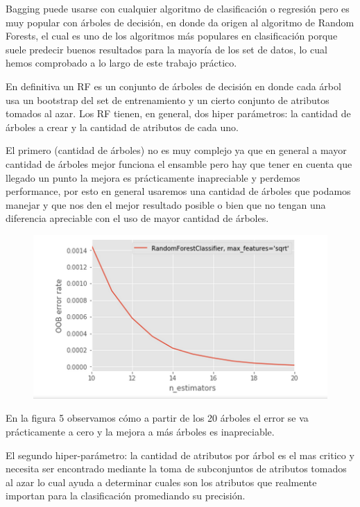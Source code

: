 \documentclass[a4paper,10pt]{article}
\begin{document}
Bagging puede usarse con cualquier algoritmo de clasificación o regresión pero es muy popular con árboles de decisión, en donde da origen al algoritmo de Random Forests, el cual es uno de los algoritmos más populares en clasificación porque suele predecir buenos resultados para la mayoría de los set de datos, lo cual hemos comprobado a lo largo de este trabajo práctico.

\medskip

En definitiva un RF es un conjunto de árboles de decisión en donde cada árbol usa un bootstrap del set de entrenamiento y un cierto conjunto de atributos tomados al azar. Los RF tienen, en general, dos hiper parámetros: la cantidad de árboles a crear y la cantidad de atributos de cada uno. 

El primero (cantidad de árboles) no es muy complejo ya que en general a mayor cantidad de árboles mejor funciona el ensamble pero hay que tener en cuenta que llegado un punto la mejora es prácticamente inapreciable y perdemos performance, por esto en general usaremos una cantidad de árboles que podamos manejar y que nos den el mejor resultado posible o bien que no tengan una diferencia apreciable con el uso de mayor cantidad de árboles.

\begin{figure}[!htp]
\centering
\includegraphics[scale=0.6]{Wireshark/OOB_1.png} 
\caption{}
\end{figure}

En la figura 5  observamos cómo a partir de los 20 árboles el error se va prácticamente a cero y la mejora a más árboles es inapreciable.

El segundo hiper-parámetro: la cantidad de atributos por árbol es el mas critico y necesita ser encontrado mediante la toma de subconjuntos de atributos tomados al azar lo cual ayuda a determinar cuales son los atributos que realmente importan para la clasificación promediando su precisión. 
\end{document}
